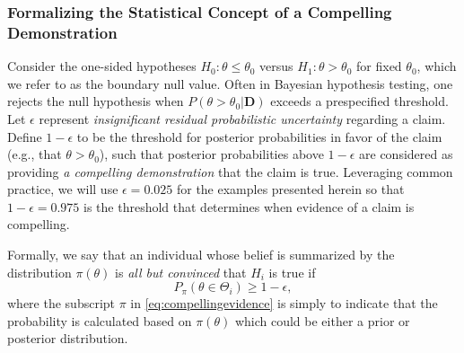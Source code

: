 \documentclass[12pt]{article}
\begin{document}
%

\subsubsection{Formalizing the Statistical Concept of a Compelling Demonstration}\label{sec:sub_evid}
Consider the one-sided hypotheses $H_0: \theta \le \theta_0$ versus $H_1: \theta > \theta_0$ for fixed $\theta_0$, which we refer to as the boundary null value.
Often in Bayesian hypothesis testing, one rejects the null hypothesis when $P(\theta > \theta_0 |\mathbf{D})$ exceeds 
a prespecified threshold.
%
Let $\epsilon$ represent \textit{insignificant residual probabilistic uncertainty} regarding a claim. 
 Define $1-\epsilon$ to be the threshold for posterior probabilities in favor of the claim 
(e.g., that $\theta > \theta_0$), such that posterior probabilities above $1-\epsilon$ are considered as providing \textit{a compelling demonstration} 
that the claim is true. 
%
Leveraging common practice, we will use $\epsilon=0.025$ for the examples presented herein 
so that $1-\epsilon=0.975$ is the threshold that determines when evidence of a claim is compelling.
%

Formally, we say that an individual whose belief is summarized by the distribution $\pi\left(\theta\right)$ is \textit{all but convinced} that $H_i$ is true if 
\begin{equation}\label{eq:compellingevidence}
		P_\pi(\theta\in\Theta_i)\geq 1-\epsilon,
\end{equation} 
where the subscript $\pi$ in \eqref{eq:compellingevidence} is simply to indicate that the probability is calculated based on $\pi\left(\theta\right)$ which could be either a prior
or posterior distribution.
\end{document}

